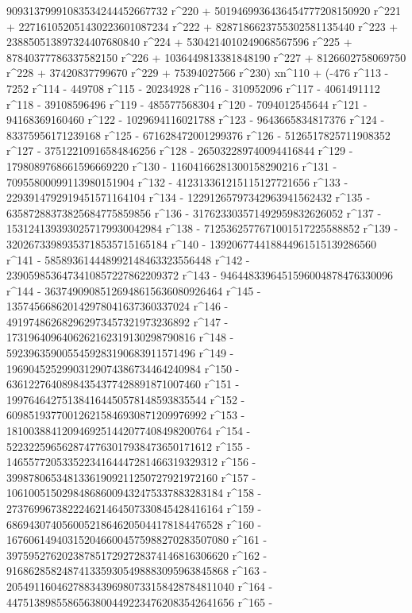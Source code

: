        90931379991083534244452667732 r^220 + 
       5019469936436454777208150920 r^221 + 
       227161052051430223601087234 r^222 + 
       8287186623755302581135440 r^223 + 
       238850513897324407680840 r^224 + 
       5304214010249068567596 r^225 + 87840377786337582150 r^226 + 
       1036449813381848190 r^227 + 8126602758069750 r^228 + 
       37420837799670 r^229 + 
       75394027566 r^230) xn^110 + (-476 r^113 - 7252 r^114 - 
       449708 r^115 - 20234928 r^116 - 310952096 r^117 - 
       4061491112 r^118 - 39108596496 r^119 - 485577568304 r^120 - 
       7094012545644 r^121 - 94168369160460 r^122 - 
       1029694116021788 r^123 - 9643665834817376 r^124 - 
       83375956171239168 r^125 - 671628472001299376 r^126 - 
       5126517825711908352 r^127 - 37512210916584846256 r^128 - 
       265032289740094416844 r^129 - 1798089768661596669220 r^130 - 
       11604166281300158290216 r^131 - 
       70955800099113980151904 r^132 - 
       412313361215115127721656 r^133 - 
       2293914792919451571164104 r^134 - 
       12291265797342963941562432 r^135 - 
       63587288373825684775859856 r^136 - 
       317623303571492959832626052 r^137 - 
       1531241393930257179930042984 r^138 - 
       7125362577671001517225588852 r^139 - 
       32026733989353718535715165184 r^140 - 
       139206774418844961515139286560 r^141 - 
       585893614448992148463323556448 r^142 - 
       2390598536473410857227862209372 r^143 - 
       9464483396451596004878476330096 r^144 - 
       36374909085126948615636080926464 r^145 - 
       135745668620142978041637360337024 r^146 - 
       491974862682962973457321973236892 r^147 - 
       1731964096406262162319130298790816 r^148 - 
       5923963590055459283190683911571496 r^149 - 
       19690452529903129074386734464240984 r^150 - 
       63612276408984354377428891871007460 r^151 - 
       199764642751384164450578148593835544 r^152 - 
       609851937700126215846930871209976992 r^153 - 
       1810038841209469251442077408498200764 r^154 - 
       5223225965628747763017938473650171612 r^155 - 
       14655772053352234164447281466319329312 r^156 - 
       39987806534813361909211250727921972160 r^157 - 
       106100515029848686009432475337883283184 r^158 - 
       273769967382224621464507330845428416164 r^159 - 
       686943074056005218646205044178184476528 r^160 - 
       1676061494031520466004575988270283507080 r^161 - 
       3975952762023878517292728374146816306620 r^162 - 
       9168628582487413359305498883095963845868 r^163 - 
       20549116046278834396980733158428784811040 r^164 - 
       44751389855865638004492234762083542641656 r^165 - 
